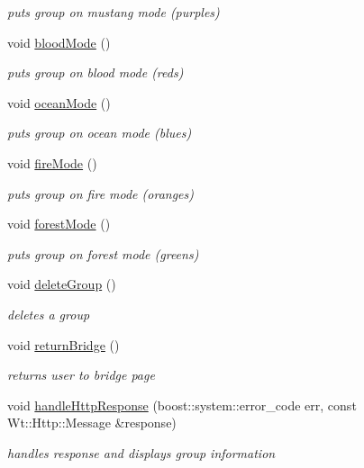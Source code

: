 \begin{DoxyCompactItemize}
\begin{DoxyCompactList}\small\item\em puts group on mustang mode (purples) \end{DoxyCompactList}\item 
void \hyperlink{classSingleGroupsControlWidget_a88810651632c7525970a816bdaa47d09}{blood\+Mode} ()
\begin{DoxyCompactList}\small\item\em puts group on blood mode (reds) \end{DoxyCompactList}\item 
void \hyperlink{classSingleGroupsControlWidget_afa302c84232d4a1fb69ef4da6528f0ec}{ocean\+Mode} ()
\begin{DoxyCompactList}\small\item\em puts group on ocean mode (blues) \end{DoxyCompactList}\item 
void \hyperlink{classSingleGroupsControlWidget_a41395f061e8d93131b0e8c1b880eab59}{fire\+Mode} ()
\begin{DoxyCompactList}\small\item\em puts group on fire mode (oranges) \end{DoxyCompactList}\item 
void \hyperlink{classSingleGroupsControlWidget_a6d940daceffefb6e5d17def4c4b24acc}{forest\+Mode} ()
\begin{DoxyCompactList}\small\item\em puts group on forest mode (greens) \end{DoxyCompactList}\item 
void \hyperlink{classSingleGroupsControlWidget_a1bb02de2f9fcda2cf5ef37c95d341975}{delete\+Group} ()
\begin{DoxyCompactList}\small\item\em deletes a group \end{DoxyCompactList}\item 
void \hyperlink{classSingleGroupsControlWidget_a25051151a10f35c0e196ccb0fd52f7f8}{return\+Bridge} ()
\begin{DoxyCompactList}\small\item\em returns user to bridge page \end{DoxyCompactList}\item 
void \hyperlink{classSingleGroupsControlWidget_a4aff4c45ad69e3fc391f89f14ecc1ebb}{handle\+Http\+Response} (boost\+::system\+::error\+\_\+code err, const Wt\+::\+Http\+::\+Message \&response)
\begin{DoxyCompactList}\small\item\em handles response and displays group information \end{DoxyCompactList}\item 

\end{DoxyCompactItemize}
